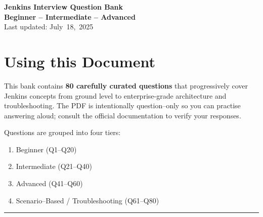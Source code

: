 \documentclass[12pt]{article}
\begin{document}
\begin{center}
{\LARGE\bfseries Jenkins Interview Question Bank\\[4pt]Beginner -- Intermediate -- Advanced}
\\[12pt]
\small Last updated: July~18,~2025
\end{center}

\section*{Using this Document}
This bank contains \textbf{80 carefully curated questions} that progressively cover Jenkins concepts from ground level to enterprise-grade architecture and troubleshooting.  The PDF is intentionally question--only so you can practise answering aloud; consult the official documentation to verify your responses.

Questions are grouped into four tiers:
\begin{enumerate}[label=\arabic*.]
  \item Beginner (Q1--Q20)
  \item Intermediate (Q21--Q40)
  \item Advanced (Q41--Q60)
  \item Scenario--Based / Troubleshooting (Q61--Q80)
\end{enumerate}

\bigskip
\hrule\bigskip
\end{document}
